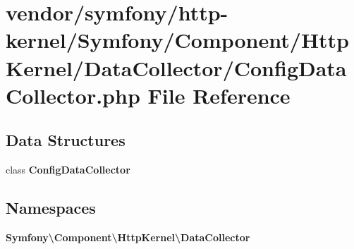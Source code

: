 \section{vendor/symfony/http-\/kernel/\+Symfony/\+Component/\+Http\+Kernel/\+Data\+Collector/\+Config\+Data\+Collector.php File Reference}
\label{_config_data_collector_8php}
\subsection*{Data Structures}
\begin{DoxyCompactItemize}
\item 
class {\bf Config\+Data\+Collector}
\end{DoxyCompactItemize}
\subsection*{Namespaces}
\begin{DoxyCompactItemize}
\item 
 {\bf Symfony\textbackslash{}\+Component\textbackslash{}\+Http\+Kernel\textbackslash{}\+Data\+Collector}
\end{DoxyCompactItemize}
